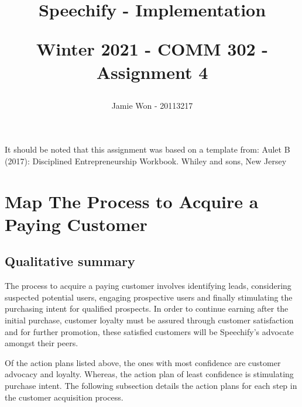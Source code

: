 \documentclass{article}
\title{
    Speechify - Implementation\\
    \begin{large}
        Winter 2021 - COMM 302 - Assignment 4
    \end{large}
}
\author{Jamie Won - 20113217}
\begin{document}
\maketitle
\vfill
It should be noted that this assignment was based on a template from: Aulet B (2017): Disciplined Entrepreneurship Workbook. Whiley and sons, New Jersey
\cleardoublepage
\tableofcontents
\cleardoublepage

\section{Map The Process to Acquire a Paying Customer}
    \subsection{Qualitative summary}
    The process to acquire a paying customer involves identifying leads, considering suspected potential users, engaging prospective users and finally stimulating the purchasing intent for qualified prospects. In order to continue earning after the initial purchase, customer loyalty must be assured through customer satisfaction and for further promotion, these satisfied customers will be Speechify's advocate amongst their peers.

    Of the action plans listed above, the ones with most confidence are customer advocacy and loyalty. Whereas, the action plan of least confidence is stimulating purchase intent. The following subsection details the action plans for each step in the customer acquisition process.
\end{document}
